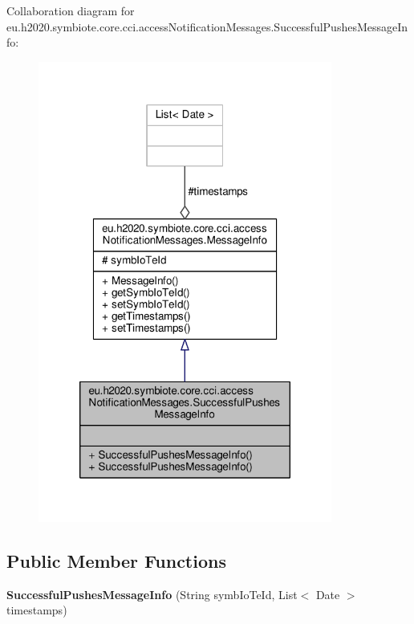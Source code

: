 Collaboration diagram for eu.\+h2020.\+symbiote.\+core.\+cci.\+access\+Notification\+Messages.\+Successful\+Pushes\+Message\+Info\+:\nopagebreak
\begin{figure}[H]
\begin{center}
\leavevmode
\includegraphics[width=274pt]{classeu_1_1h2020_1_1symbiote_1_1core_1_1cci_1_1accessNotificationMessages_1_1SuccessfulPushesMessageInfo__coll__graph}
\end{center}
\end{figure}
\subsection*{Public Member Functions}
\begin{DoxyCompactItemize}
\item 
\mbox{\label{classeu_1_1h2020_1_1symbiote_1_1core_1_1cci_1_1accessNotificationMessages_1_1SuccessfulPushesMessageInfo_a3a1e4570e1fab72a4a2a718a30d74bf6}} 
{\bfseries Successful\+Pushes\+Message\+Info} (String symb\+Io\+Te\+Id, List$<$ Date $>$ timestamps)
\end{DoxyCompactItemize}
